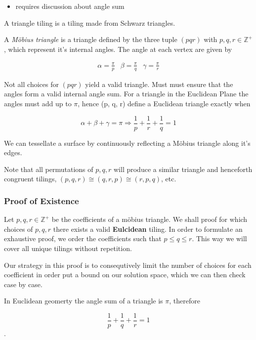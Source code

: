 \begin{itemize}
\tightlist
\item[$\square$]
  requires discussion about angle sum
\end{itemize}

A triangle tiling is a tiling made from Schwarz triangles.

A \emph{Möbius triangle} is a triangle defined by the three tuple \((p q r)\) with \(p, q, r \in \mathbb{Z}^+\), which represent it's internal angles. The
angle at each vertex are given by

\[
\begin{matrix}
\alpha = \frac{\pi}{p} & \beta = \frac{\pi}{q} & \gamma = \frac{\pi}{r}
\end{matrix}
\]

Not all choices for \((p q r)\) yield a valid triangle. Must must ensure
that the angles form a valid internal angle sum. For a triangle in the
Euclidean Plane the angles must add up to \(\pi\), hence (p, q, r)
define a Euclidean triangle exactly when

\[
\alpha + \beta + \gamma = \pi \Rightarrow
\frac{1}{p} + \frac{1}{r} + \frac{1}{q} = 1
\]

We can tessellate a surface by continuously reflecting a Möbius triangle
along it's edges.

Note that all permutations of \(p, q, r\) will produce a similar
triangle and henceforth congruent tilings,
\((p, q, r) \cong (q, r, p) \cong (r, p, q)\), etc.

\subsubsection{Proof of Existence}\label{proof-of-existence}

Let \(p, q, r \in \mathbb{Z}^+\) be the coefficients of a möbius
triangle. We shall proof for which choices of \(p, q, r\) there exists a
valid \textbf{Eulcidean} tiling. In order to formulate an exhaustive
proof, we order the coefficients such that \(p \le q \le r\). This way
we will cover all unique tilings without repetition.

Our strategy in this proof is to consequtively limit the number of
choices for each coefficient in order put a bound on our solution space, which we can then check case by case.

In Euclidean geomerty the angle sum of a triangle is \(\pi\), therefore

\begin{equation}
\frac{1}{p} + \frac{1}{q} + \frac{1}{r} = 1
\label{eq:pqr-sum-euc}
\end{equation}.

